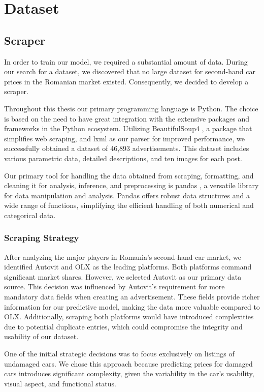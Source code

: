 \chapter{Dataset}

\section{Scraper}

In order to train our model, we required a substantial amount of data. During our search for a dataset, we discovered that no large dataset for second-hand car prices in the Romanian market existed. Consequently, we decided to develop a scraper.

Throughout this thesis our primary programming language is Python. The choice is based on the need to have great integration with the extensive packages and frameworks in the Python ecosystem. Utilizing BeautifulSoup4 \cite{bs4}, a package that simplifies web scraping, and lxml \cite{lxml} as our parser for improved performance, we successfully obtained a dataset of 46,893 advertisements. This dataset includes various parametric data, detailed descriptions, and ten images for each post.

Our primary tool for handling the data obtained from scraping, formatting, and cleaning it for analysis, inference, and preprocessing is pandas \cite{pandas}, a versatile library for data manipulation and analysis. Pandas offers robust data structures and a wide range of functions, simplifying the efficient handling of both numerical and categorical data.

\subsection{Scraping Strategy}

After analyzing the major players in Romania's second-hand car market, we identified Autovit and OLX as the leading platforms. Both platforms command significant market shares. However, we selected Autovit as our primary data source. This decision was influenced by Autovit's requirement for more mandatory data fields when creating an advertisement. These fields provide richer information for our predictive model, making the data more valuable compared to OLX. Additionally, scraping both platforms would have introduced complexities due to potential duplicate entries, which could compromise the integrity and usability of our dataset.

One of the initial strategic decisions was to focus exclusively on listings of undamaged cars. We chose this approach because predicting prices for damaged cars introduces significant complexity, given the variability in the car's usability, visual aspect, and functional status.

